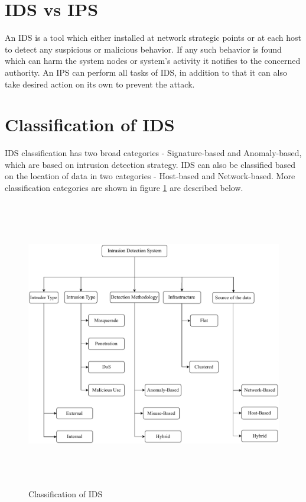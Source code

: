\section{IDS vs IPS}
An IDS is a tool which either installed at network strategic points or at each host to detect any suspicious or malicious behavior. If any such behavior is found which can harm the system nodes or system's activity it notifies to the concerned authority. An IPS can perform all tasks of IDS, in addition to that it can also take desired action on its own to prevent the attack.
\section{Classification of IDS}
IDS classification has two broad categories - Signature-based and Anomaly-based, which are based on intrusion detection strategy. IDS can also be classified based on the location of data in two categories - Host-based and Network-based. More classification categories are shown in figure \ref{IDS-Classification} \cite{alrajeh2013intrusion, farooqi2009intrusion} are described below.

\begin{figure}[ht]
\center	
\includegraphics[width=\textwidth, height=5in] {Figures/PDF/IDS_Classification.pdf}
\caption{Classification of IDS}
\label{IDS-Classification}	
\end{figure}

